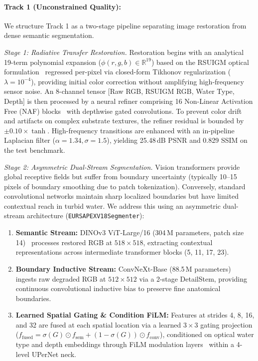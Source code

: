 \documentclass{article}
\begin{document}
\paragraph{Track 1 (Unconstrained Quality):} We structure Track 1 as a two-stage pipeline separating image restoration from dense semantic segmentation.

\emph{Stage 1: Radiative Transfer Restoration.} Restoration begins with an analytical 19-term polynomial expansion ($\phi(r,g,b) \in \mathbb{R}^{19}$) based on the RSUIGM optical formulation~\cite{desai2024rsuigm} regressed per-pixel via closed-form Tikhonov regularization ($\lambda = 10^{-4}$), providing initial color correction without amplifying high-frequency sensor noise. An 8-channel tensor [Raw RGB, RSUIGM RGB, Water Type, Depth] is then processed by a neural refiner comprising 16 Non-Linear Activation Free (NAF) blocks~\cite{chen2022nafnet} with depthwise gated convolutions. To prevent color drift and artifacts on complex substrate textures, the refiner residual is bounded by $\pm 0.10 \times \tanh$. High-frequency transitions are enhanced with an in-pipeline Laplacian filter ($\alpha=1.34, \sigma=1.5$), yielding 25.48\,dB PSNR and 0.829 SSIM on the test benchmark.

\emph{Stage 2: Asymmetric Dual-Stream Segmentation.} Vision transformers provide global receptive fields but suffer from boundary uncertainty (typically 10--15 pixels of boundary smoothing due to patch tokenization). Conversely, standard convolutional networks maintain sharp localized boundaries but have limited contextual reach in turbid water. We address this using an asymmetric dual-stream architecture (\texttt{EURSAPEXV18Segmenter}):
\begin{enumerate}[leftmargin=*]
    \item \textbf{Semantic Stream:} DINOv3 ViT-Large/16 (304\,M parameters, patch size 14)~\cite{oquab2023dinov2} processes restored RGB at $518\times518$, extracting contextual representations across intermediate transformer blocks (5, 11, 17, 23).
    \item \textbf{Boundary Inductive Stream:} ConvNeXt-Base (88.5\,M parameters)~\cite{liu2022convnet} ingests raw degraded RGB at $512\times512$ via a 2-stage DetailStem, providing continuous convolutional inductive bias to preserve fine anatomical boundaries.
    \item \textbf{Learned Spatial Gating \& Condition FiLM:} Features at strides 4, 8, 16, and 32 are fused at each spatial location via a learned $3\times3$ gating projection ($f_{\text{fused}} = \sigma(G) \odot f_{\text{sem}} + (1 - \sigma(G)) \odot f_{\text{conv}}$), conditioned on optical water type and depth embeddings through FiLM modulation layers~\cite{perez2018film} within a 4-level UPerNet neck.
\end{enumerate}
\end{document}
